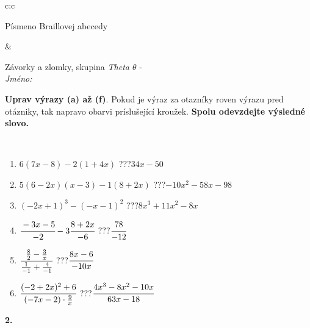 \documentclass[10pt]{report}
\begin{document}
\begin{tabular}{c:c}
\begin{minipage}[c][104.5mm][t]{0.5\linewidth}
\begin{center}
\begin{minipage}{0.20\linewidth}
\begin{center}
{\small Písmeno Braillovej abecedy}
\end{center}
\end{minipage}
\end{center}
\end{minipage}
&
\begin{minipage}[c][104.5mm][t]{0.5\linewidth}
\begin{center}
\vspace{7mm}
{\huge Závorky a zlomky, skupina \textit{Theta $\theta$} -}\\[5mm]
\textit{Jméno:}\phantom{xxxxxxxxxxxxxxxxxxxxxxxxxxxxxxxxxxxxxxxxxxxxxxxxxxxxxxxxxxxxxxxxx}\\[5mm]
\begin{minipage}{0.95\linewidth}
\begin{center}
\textbf{Uprav výrazy (a) až (f)}. Pokud je výraz za otazníky roven výrazu pred otázniky, tak napravo obarvi príslušející kroužek. \textbf{Spolu odevzdejte výsledné slovo.}
\end{center}
\end{minipage}
\\[1mm]
\begin{minipage}{0.79\linewidth}
\begin{center}
\begin{varwidth}{\linewidth}
\begin{enumerate}
\normalsize
\item $6(7x-8)-2(1+4x)$\quad \dotfill\; ???\;\dotfill \quad $34x-50$
\item $5(6-2x)(x-3)-1(8+2x)$\quad \dotfill\; ???\;\dotfill \quad $-10x^2-58x-98$
\item $(-2x+1)^3-(-x-1)^2$\quad \dotfill\; ???\;\dotfill \quad $8x^3+11x^2-8x$
\item $\cfrac{-3x-5}{-2}-3\cfrac{8+2x}{-6}$\quad \dotfill\; ???\;\dotfill \quad $\cfrac{78}{-12}$
\item $\cfrac{\frac{8}{2}-\frac{3}{x}}{\frac{1}{-1}+\frac{4}{-1}}$\quad \dotfill\; ???\;\dotfill \quad $\cfrac{8x-6}{-10x}$
\item $\cfrac{(-2+2x)^2+6}{(-7x-2)\cdot\frac{9}{x}}$\quad \dotfill\; ???\;\dotfill \quad $\cfrac{4x^3-8x^2-10x}{63x-18}$
\end{enumerate}
\end{varwidth}
\end{center}
\end{minipage}
\begin{minipage}{0.20\linewidth}
\begin{center}
{\Huge\bfseries 2.} \\[2mm]

\end{center}
\end{minipage}
\end{center}
\end{minipage}
\end{tabular}
\end{document}
